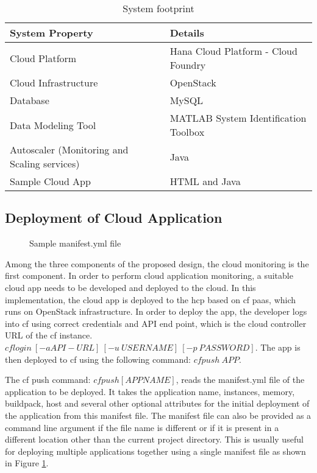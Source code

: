 \documentclass[article,type=msc,colorback,12pt,accentcolor=tud8b,table]{tudthesis}
\begin{document}
\begin{table}[H]
	\centering
	\caption{System footprint}
	\label{tab:system_footprint}
	\begin{tabular}{|l|l|}
		\hline
		\rowcolor[HTML]{EC6500} 
		\textbf{System Property}  & \textbf{Details}                     \\ \hline
		Cloud Platform            & Hana Cloud Platform - Cloud Foundry  \\ \hline
		Cloud Infrastructure      & OpenStack                            \\ \hline
		Database                  & MySQL                                \\ \hline
		Data Modeling Tool        & MATLAB System Identification Toolbox \\ \hline
		Autoscaler (Monitoring and Scaling services) & Java                                 \\ \hline
		Sample Cloud App          & HTML and Java                        \\ \hline
	\end{tabular}
\end{table}

 
	\subsection{Deployment of Cloud Application} 

 \begin{figure}[!h]
 	\begin{center}
 		\makebox[\textwidth]{\texttt{[image: D2]}}
 	\end{center}
 	\caption{Sample manifest.yml file}
 	\label{fig:sample_manifest}
 \end{figure}
	
	Among the three components of the proposed design, the cloud monitoring is the first component. In order to perform cloud application monitoring, a suitable cloud app needs to be developed and deployed to the cloud. In this implementation, the cloud app is deployed to the \gls{hcp} based on \gls{cf} \gls{paas}, which runs on OpenStack \cite{openstack} infrastructure. In order to deploy the app, the developer logs into \gls{cf} using correct credentials and API end point, which is the cloud controller URL of the \gls{cf} instance. $ cf login \: [-a API-URL] \: [-u \: USERNAME] \: [-p \: PASSWORD] $. The app is then deployed to \gls{cf} using the following command: $ cf push \: APP $.		

The \gls{cf} push command:  $ cf push  [APPNAME] $, reads the manifest.yml file of the application to be deployed. It takes the application name, instances, memory, buildpack, host and several other optional attributes for the initial deployment of the application from this manifest file. The manifest file can also be provided as a command line argument if the file name is different or if it is present in a different location other than the current project directory. This is usually useful for deploying multiple applications together using a single manifest file as shown in Figure \ref{fig:sample_manifest}.
	
\end{document}
